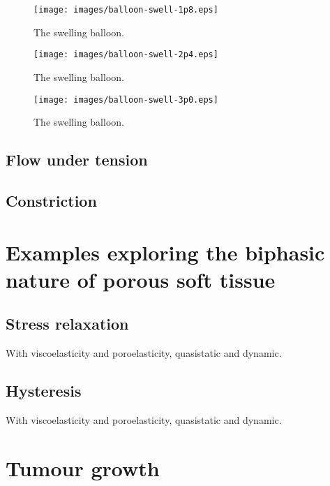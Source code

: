 \begin{figure}
\centering
{\texttt{[image: images/balloon-swell-1p8.eps]}}
\caption{The swelling balloon.} 
\label{swelling-balloon-image-3}
\end{figure}

\begin{figure}
\centering
{\texttt{[image: images/balloon-swell-2p4.eps]}}
\caption{The swelling balloon.} 
\label{swelling-balloon-image-4}
\end{figure}

\begin{figure}
\centering
{\texttt{[image: images/balloon-swell-3p0.eps]}}
\caption{The swelling balloon.} 
\label{swelling-balloon-image-5}
\end{figure}

\subsection{Flow under tension}
\label{tenson-flow}

\subsection{Constriction}
\label{constriction-2}

\section{Examples exploring the biphasic nature of porous soft tissue}
\label{biphasic-examples-2}

\subsection{Stress relaxation}
\label{stress-relaxation}
With viscoelasticity and poroelasticity, quasistatic and dynamic.

\subsection{Hysteresis}
\label{hysteresis}
With viscoelasticity and poroelasticity, quasistatic and dynamic.

\section{Tumour growth}
\label{tumor-growth}

%

